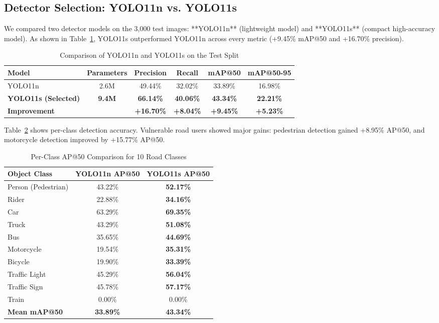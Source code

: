 \documentclass{article}
\begin{document}
\subsection{Detector Selection: YOLO11n vs. YOLO11s}
We compared two detector models on the 3,000 test images: **YOLO11n** (lightweight model) and **YOLO11s** (compact high-accuracy model). As shown in Table~\ref{tab:detector_comparison}, YOLO11s outperformed YOLO11n across every metric (+9.45\% mAP@50 and +16.70\% precision).

\begin{table}[!ht]
\centering
\small
\caption{Comparison of YOLO11n and YOLO11s on the Test Split}
\label{tab:detector_comparison}
\begin{tabular}{lccccc}
\toprule
\textbf{Model} & \textbf{Parameters} & \textbf{Precision} & \textbf{Recall} & \textbf{mAP@50} & \textbf{mAP@50-95} \\
\midrule
YOLO11n & 2.6M & 49.44\% & 32.02\% & 33.89\% & 16.98\% \\
\textbf{YOLO11s (Selected)} & \textbf{9.4M} & \textbf{66.14\%} & \textbf{40.06\%} & \textbf{43.34\%} & \textbf{22.21\%} \\
\midrule
\textbf{Improvement} & & \textbf{+16.70\%} & \textbf{+8.04\%} & \textbf{+9.45\%} & \textbf{+5.23\%} \\
\bottomrule
\end{tabular}
\end{table}

Table~\ref{tab:per_class_map} shows per-class detection accuracy. Vulnerable road users showed major gains: pedestrian detection gained +8.95\% AP@50, and motorcycle detection improved by +15.77\% AP@50.

\begin{table}[!ht]
\centering
\small
\caption{Per-Class AP@50 Comparison for 10 Road Classes}
\label{tab:per_class_map}
\begin{tabular}{lcc}
\toprule
\textbf{Object Class} & \textbf{YOLO11n AP@50} & \textbf{YOLO11s AP@50} \\
\midrule
Person (Pedestrian) & 43.22\% & \textbf{52.17\%} \\
Rider & 22.88\% & \textbf{34.16\%} \\
Car & 63.29\% & \textbf{69.35\%} \\
Truck & 43.29\% & \textbf{51.08\%} \\
Bus & 35.65\% & \textbf{44.69\%} \\
Motorcycle & 19.54\% & \textbf{35.31\%} \\
Bicycle & 19.90\% & \textbf{33.39\%} \\
Traffic Light & 45.29\% & \textbf{56.04\%} \\
Traffic Sign & 45.78\% & \textbf{57.17\%} \\
Train & 0.00\% & 0.00\% \\
\midrule
\textbf{Mean mAP@50} & \textbf{33.89\%} & \textbf{43.34\%} \\
\bottomrule
\end{tabular}
\end{table}
\end{document}
